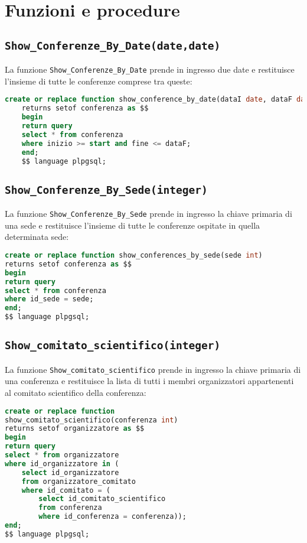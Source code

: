\section{Funzioni e procedure}
\subsection{\texttt{Show\_Conferenze\_By\_Date(date,date)}}
La funzione \texttt{Show\_Conferenze\_By\_Date} prende in ingresso due date e restituisce l'insieme di tutte le conferenze comprese tra queste:
\begin{lstlisting}[language=SQL, style=mystyle]
	create or replace function show_conference_by_date(dataI date, dataF date)
	returns setof conferenza as $$
	begin
	return query
	select * from conferenza
	where inizio >= start and fine <= dataF;
	end;
	$$ language plpgsql;
\end{lstlisting}
\subsection{\texttt{Show\_Conferenze\_By\_Sede(integer)}}
La funzione \texttt{Show\_Conferenze\_By\_Sede} prende in ingresso la chiave primaria di una sede e restituisce l'insieme di tutte le conferenze ospitate in quella determinata sede:
\begin{lstlisting}[language=SQL, style=mystyle]
create or replace function show_conferences_by_sede(sede int)
returns setof conferenza as $$
begin
return query
select * from conferenza
where id_sede = sede;
end;
$$ language plpgsql;
\end{lstlisting}
\subsection{\texttt{Show\_comitato\_scientifico(integer)}}
La funzione \texttt{Show\_comitato\_scientifico} prende in ingresso la chiave primaria di una conferenza e restituisce la lista di tutti i membri organizzatori appartenenti al comitato scientifico della conferenza:
\begin{lstlisting}[language=SQL, style=mystyle]
create or replace function 
show_comitato_scientifico(conferenza int)
returns setof organizzatore as $$
begin
return query
select * from organizzatore
where id_organizzatore in (
	select id_organizzatore 
	from organizzatore_comitato
	where id_comitato = (
		select id_comitato_scientifico 
		from conferenza
		where id_conferenza = conferenza));
end;
$$ language plpgsql;
\end{lstlisting}
